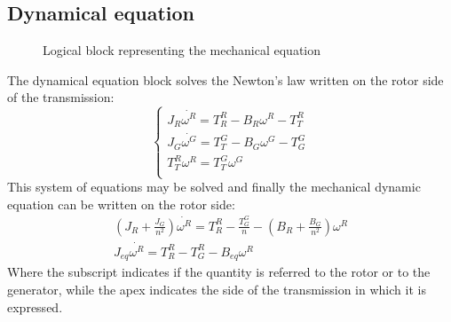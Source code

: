 \subsection{Dynamical equation}
\begin{figure}
  \centering
  
  \caption{Logical block representing the mechanical equation}
  \label{fig:d_mech_equation_block}
\end{figure}
The dynamical equation block solves the Newton's law written on the rotor side of the transmission:
\begin{equation}
    \begin{cases}
      J_R \dot{\omega^R} = T_R^R - B_R\omega^R - T_T^R\\
      J_G \dot{\omega^G} = T_T^G - B_G\omega^G - T_G^G\\
      T_T^R\omega^R = T_T^G\omega^G\\
    \end{cases}
\end{equation}
This system of equations may be solved and finally the mechanical dynamic equation can be written on the rotor side:
\begin{gather}
    \left(J_R + \frac{J_G}{n^2}\right) \dot{\omega^R} = T_R^R - \frac{T_G^G}{n} - \left(B_R + \frac{B_G}{n^2}\right)\omega^R \\
    J_{eq} \dot{\omega^R} = T_R^R - T_G^R - B_{eq}\omega^R
    \label{eq:mech_eq}
\end{gather}
Where the subscript indicates if the quantity is referred to the rotor or to the generator, while the apex indicates the side of the transmission in which it is expressed.

